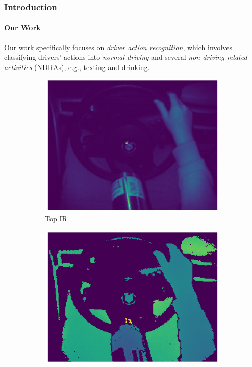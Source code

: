 \begin{frame}
\frametitle{Introduction}
\framesubtitle{Our Work}

Our work specifically focuses on \textit{driver action recognition}, which involves classifying drivers' actions into \textit{normal driving} and several \textit{non-driving-related activities} (NDRAs), e.g., texting and drinking.

\begin{figure}
    \centering
    \begin{subfigure}[b]{0.24\textwidth}
        \centering
        \includegraphics[width=\textwidth]{images/dad_top_ir.png}
        \caption{Top IR}
        \label{fig:2.a}
    \end{subfigure}
    \hfill
    \begin{subfigure}[b]{0.24\textwidth}
        \centering
        \includegraphics[width=\textwidth]{images/dad_top_depth.png}

\end{subfigure}
\end{figure}
\end{frame}
